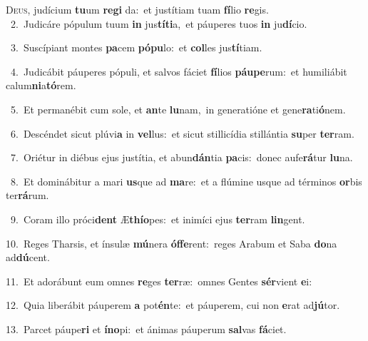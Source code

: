 \lettrine{\initial\textcolor{\initialcolor}{D}}{eus,} judícium \textbf{tu}\-um \textbf{re}\-\textbf{gi} da:~\star et justítiam tuam \textbf{fí}\-lio \textbf{re}\-gis.\\
{\numbfont\textcolor{\numbcolor}{~2.}}~Judicáre pópulum tuum \textbf{in} jus\-\textbf{tí}\-\textbf{ti}a,~\star et páuperes tuos \textbf{in} ju\-\textbf{dí}\-cio.\par
{\numbfont\textcolor{\numbcolor}{~3.}}~Suscípiant montes \textbf{pa}\-cem \textbf{pó}\-\textbf{pu}lo:~\star et \textbf{col}\-les jus\-\textbf{tí}\-tiam.\par
{\numbfont\textcolor{\numbcolor}{~4.}}~Judicábit páuperes pópuli, et salvos fáciet \textbf{fí}\-lios \textbf{páu}\-\textbf{pe}rum:~\star et humiliábit calum\-\textbf{ni}\-a\-\textbf{tó}\-rem.\par
{\numbfont\textcolor{\numbcolor}{~5.}}~Et permanébit cum sole, et \textbf{an}\-te \textbf{lu}\-nam,~\star in generatióne et gene\-\textbf{ra}\-ti\-\textbf{ó}\-nem.\par
{\numbfont\textcolor{\numbcolor}{~6.}}~Descéndet sicut plúvi\textbf{a} in \textbf{vel}\-lus:~\star et sicut stillicídia stillántia \textbf{su}\-per \textbf{ter}\-ram.\par
{\numbfont\textcolor{\numbcolor}{~7.}}~Oriétur in diébus ejus justítia, et abun\-\textbf{dán}\-tia \textbf{pa}\-cis:~\star donec aufe\-\textbf{rá}\-tur \textbf{lu}\-na.\par
{\numbfont\textcolor{\numbcolor}{~8.}}~Et dominábitur a mari \textbf{us}\-que ad \textbf{ma}\-re:~\star et a flúmine usque ad términos \textbf{or}\-bis ter\-\textbf{rá}\-rum.\par
{\numbfont\textcolor{\numbcolor}{~9.}}~Coram illo próci\textbf{dent} Æ\-\textbf{thí}\-\textbf{o}pes:~\star et inimíci ejus \textbf{ter}\-ram \textbf{lin}\-gent.\par
{\numbfont\textcolor{\numbcolor}{10.}}~Reges Tharsis, et ínsulæ \textbf{mú}\-nera \textbf{óf}\-\textbf{fe}rent:~\star reges Arabum et Saba \textbf{do}\-na ad\-\textbf{dú}\-cent.\par
{\numbfont\textcolor{\numbcolor}{11.}}~Et adorábunt eum omnes \textbf{re}\-ges \textbf{ter}\-ræ:~\star omnes Gentes \textbf{sér}\-vient \textbf{e}\-i:\par
{\numbfont\textcolor{\numbcolor}{12.}}~Quia liberábit páuperem \textbf{a} pot\-\textbf{én}\-te:~\star et páuperem, cui non \textbf{e}\-rat ad\-\textbf{jú}\-tor.\par
{\numbfont\textcolor{\numbcolor}{13.}}~Parcet páupe\textbf{ri} et \textbf{ín}\-\textbf{o}pi:~\star et ánimas páuperum \textbf{sal}\-vas \textbf{fá}\-ciet.\par
